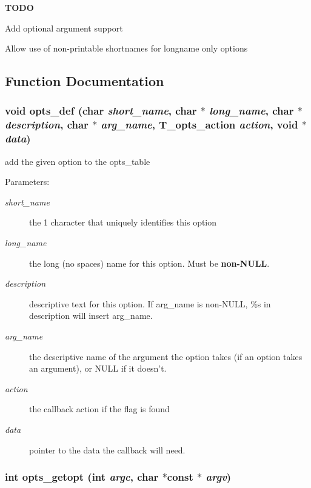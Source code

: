 {\bf TODO}\begin{CompactItemize}
\item 
Add optional argument support\item 
Allow use of non-printable shortnames for longname only options \end{CompactItemize}


\subsection{Function Documentation}
\subsubsection{\setlength{\rightskip}{0pt plus 5cm}void opts\_\-def (char {\em short\_\-name}, char $\ast$ {\em long\_\-name}, char $\ast$ {\em description}, char $\ast$ {\em arg\_\-name}, {\bf T\_\-opts\_\-action} {\em action}, void $\ast$ {\em data})}\label{group__opts_a1}


add the given option to the opts\_\-table

\begin{Desc}
\item[Parameters: ]\par
\begin{description}
\item[{\em 
short\_\-name}]the 1 character that uniquely identifies this option \item[{\em 
long\_\-name}]the long (no spaces) name for this option. Must be {\bf non-NULL}. \item[{\em 
description}]descriptive text for this option. If arg\_\-name is non-NULL, \%s in description will insert arg\_\-name. \item[{\em 
arg\_\-name}]the descriptive name of the argument the option takes (if an option takes an argument), or NULL if it doesn't. \item[{\em 
action}]the callback action if the flag is found \item[{\em 
data}]pointer to the data the callback will need. \end{description}
\end{Desc}
\subsubsection{\setlength{\rightskip}{0pt plus 5cm}int opts\_\-getopt (int {\em argc}, char $\ast$const $\ast$ {\em argv})}\label{group__opts_a3}


